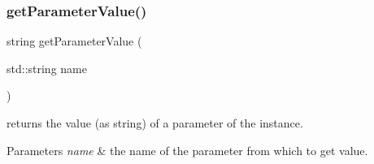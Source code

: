 \subsubsection{\texorpdfstring{get\+Parameter\+Value()}{getParameterValue()}}
{\footnotesize\ttfamily string get\+Parameter\+Value (\begin{DoxyParamCaption}\item[{std\+::string}]{name }\end{DoxyParamCaption})}



returns the value (as string) of a parameter of the instance. 


\begin{DoxyParams}{Parameters}
{\em name} & the name of the parameter from which to get value. \\
\hline
\end{DoxyParams}

